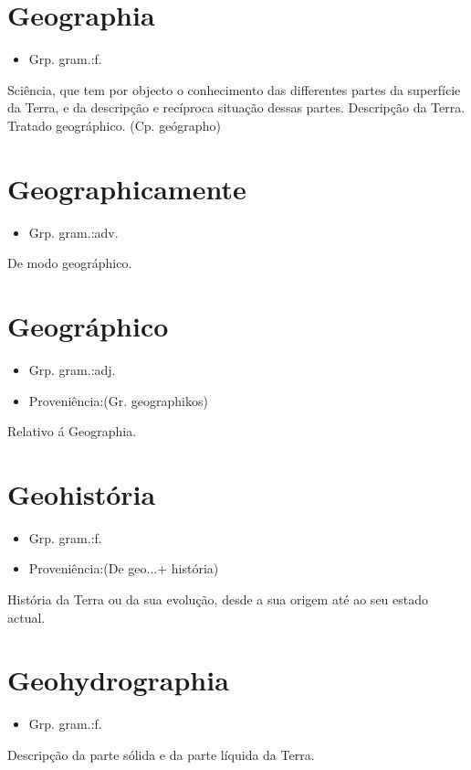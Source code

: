 \section{Geographia}
\begin{itemize}
\item {Grp. gram.:f.}
\end{itemize}
Sciência, que tem por objecto o conhecimento das differentes partes da superfície da Terra, e da descripção e recíproca situação dessas partes.
Descripção da Terra.
Tratado geográphico.
(Cp. \textunderscore geógrapho\textunderscore )
\section{Geographicamente}
\begin{itemize}
\item {Grp. gram.:adv.}
\end{itemize}
De modo geográphico.
\section{Geográphico}
\begin{itemize}
\item {Grp. gram.:adj.}
\end{itemize}
\begin{itemize}
\item {Proveniência:(Gr. \textunderscore geographikos\textunderscore )}
\end{itemize}
Relativo á Geographia.
\section{Geohistória}
\begin{itemize}
\item {Grp. gram.:f.}
\end{itemize}
\begin{itemize}
\item {Proveniência:(De \textunderscore geo...\textunderscore  + \textunderscore história\textunderscore )}
\end{itemize}
História da Terra ou da sua evolução, desde a sua origem até ao seu estado actual.
\section{Geohydrographia}
\begin{itemize}
\item {Grp. gram.:f.}
\end{itemize}
Descripção da parte sólida e da parte líquida da Terra.
